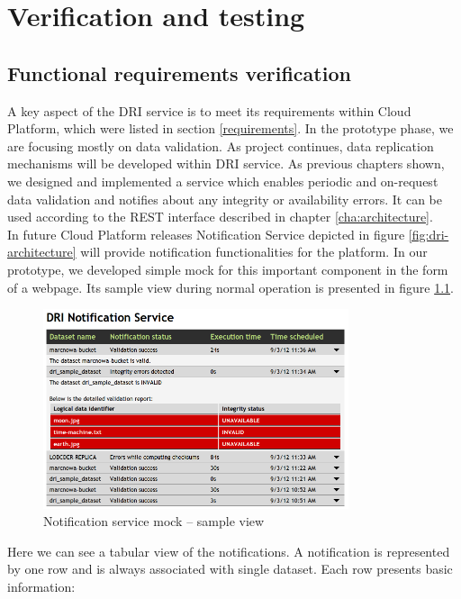 \chapter{Verification and testing}
\label{cha:testing}

	\section{Functional requirements verification}
A key aspect of the DRI service is to meet its requirements within Cloud
Platform, which were listed in section \ref{requirements}. In the prototype
phase, we are focusing mostly on data validation. As project continues, data
replication mechanisms will be developed within DRI service. As previous
chapters shown, we designed and implemented a service which enables periodic
and on-request data validation and notifies about any integrity or availability
errors. It can be used according to the REST interface described in chapter
\ref{cha:architecture}.\\

In future Cloud Platform releases Notification Service depicted in figure
\ref{fig:dri-architecture} will provide notification functionalities for the
platform. In our prototype, we developed simple mock for this important
component in the form of a webpage. Its sample view during normal operation is
presented in figure \ref{fig:notification-service}.

\begin{figure}[h!]
	\centering
	\includegraphics[width=0.8\textwidth]{images/notification-service.png}
	\caption{Notification service mock -- sample view}
	\label{fig:notification-service}
\end{figure}

Here we can see a tabular view of the notifications. A notification
is represented by one row and is always associated with single dataset.
Each row presents basic information: 

